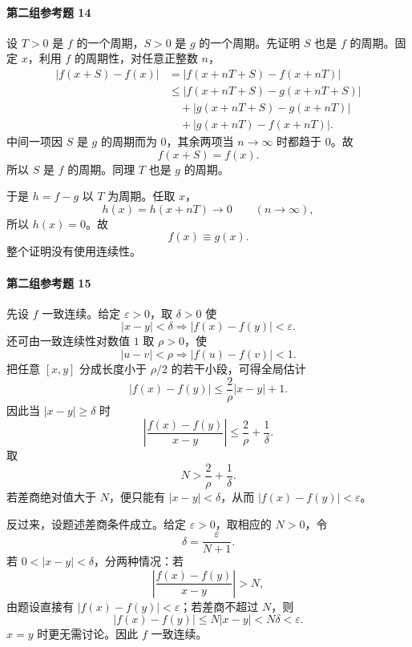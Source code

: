 \paragraph{第二组参考题 14}
\begin{xsolution}
设 $T>0$ 是 $f$ 的一个周期，$S>0$ 是 $g$ 的一个周期。先证明 $S$ 也是 $f$ 的周期。固定 $x$，利用 $f$ 的周期性，对任意正整数 $n$，
\[
 \begin{aligned}
 |f(x+S)-f(x)|
 &=|f(x+nT+S)-f(x+nT)|\\
 &\le |f(x+nT+S)-g(x+nT+S)|\\
 &\quad+|g(x+nT+S)-g(x+nT)|\\
 &\quad+|g(x+nT)-f(x+nT)|.
 \end{aligned}
\]
中间一项因 $S$ 是 $g$ 的周期而为 $0$，其余两项当 $n\to\infty$ 时都趋于 $0$。故
\[
 f(x+S)=f(x).
\]
所以 $S$ 是 $f$ 的周期。同理 $T$ 也是 $g$ 的周期。

于是 $h=f-g$ 以 $T$ 为周期。任取 $x$，
\[
 h(x)=h(x+nT)\to0
 \qquad(n\to\infty),
\]
所以 $h(x)=0$。故
\[
 f(x)\equiv g(x).
\]
整个证明没有使用连续性。
\end{xsolution}

\paragraph{第二组参考题 15}
\begin{xsolution}
先设 $f$ 一致连续。给定 $\varepsilon>0$，取 $\delta>0$ 使
\[
 |x-y|<\delta\Longrightarrow |f(x)-f(y)|<\varepsilon.
\]
还可由一致连续性对数值 $1$ 取 $\rho>0$，使
\[
 |u-v|<\rho\Longrightarrow |f(u)-f(v)|<1.
\]
把任意 $[x,y]$ 分成长度小于 $\rho/2$ 的若干小段，可得全局估计
\[
 |f(x)-f(y)|
 \le \frac{2}{\rho}|x-y|+1.
\]
因此当 $|x-y|\ge\delta$ 时
\[
 \left|\frac{f(x)-f(y)}{x-y}\right|
 \le\frac2\rho+\frac1\delta.
\]
取
\[
 N>\frac2\rho+\frac1\delta.
\]
若差商绝对值大于 $N$，便只能有 $|x-y|<\delta$，从而 $|f(x)-f(y)|<\varepsilon$。

反过来，设题述差商条件成立。给定 $\varepsilon>0$，取相应的 $N>0$，令
\[
 \delta=\frac\varepsilon{N+1}.
\]
若 $0<|x-y|<\delta$，分两种情况：若
\[
 \left|\frac{f(x)-f(y)}{x-y}\right|>N,
\]
由题设直接有 $|f(x)-f(y)|<\varepsilon$；若差商不超过 $N$，则
\[
 |f(x)-f(y)|\le N|x-y|<N\delta<\varepsilon.
\]
$x=y$ 时更无需讨论。因此 $f$ 一致连续。
\end{xsolution}

